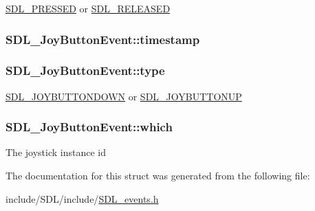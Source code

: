 \hyperlink{_s_d_l__events_8h_aee81bbffbc8489bdea8fecd1232c4bd1}{S\-D\-L\-\_\-\-P\-R\-E\-S\-S\-E\-D} or \hyperlink{_s_d_l__events_8h_ad680a069f9fcab80de91b3eefdf29c3c}{S\-D\-L\-\_\-\-R\-E\-L\-E\-A\-S\-E\-D} \hypertarget{struct_s_d_l___joy_button_event_ab50b6f7d1ab3ac53df69fc2d6cf5fa2a}{
\subsubsection[{timestamp}]{ S\-D\-L\-\_\-\-Joy\-Button\-Event\-::timestamp}}\label{struct_s_d_l___joy_button_event_ab50b6f7d1ab3ac53df69fc2d6cf5fa2a}
\hypertarget{struct_s_d_l___joy_button_event_a8f3312a046d37fa2884b93f69c4cb655}{
\subsubsection[{type}]{ S\-D\-L\-\_\-\-Joy\-Button\-Event\-::type}}\label{struct_s_d_l___joy_button_event_a8f3312a046d37fa2884b93f69c4cb655}
\hyperlink{_s_d_l__events_8h_a3b589e89be6b35c02e0dd34a55f3fccaa386ac978bc145a45883fe0adab70710b}{S\-D\-L\-\_\-\-J\-O\-Y\-B\-U\-T\-T\-O\-N\-D\-O\-W\-N} or \hyperlink{_s_d_l__events_8h_a3b589e89be6b35c02e0dd34a55f3fccaa76f91c81110f012e3a47cbbc0449e3c3}{S\-D\-L\-\_\-\-J\-O\-Y\-B\-U\-T\-T\-O\-N\-U\-P} \hypertarget{struct_s_d_l___joy_button_event_a1679049adad7242b28420948fdc79044}{
\subsubsection[{which}]{ S\-D\-L\-\_\-\-Joy\-Button\-Event\-::which}}\label{struct_s_d_l___joy_button_event_a1679049adad7242b28420948fdc79044}
The joystick instance id 

The documentation for this struct was generated from the following file\-:\begin{DoxyCompactItemize}
\item 
include/\-S\-D\-L/include/\hyperlink{_s_d_l__events_8h}{S\-D\-L\-\_\-events.\-h}\end{DoxyCompactItemize}
